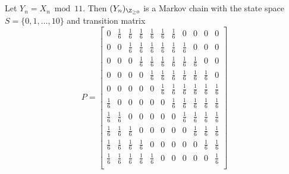 \documentclass[
  coursecode={MTHE 455},
  assignmentname={Assignment \assignmentnumber},
  studentnumber=20053722,
  name={Bryan Hoang},
  draft,
]{
  ltxanswer%
}
\begin{document}
\begin{questions}
\begin{parts}
      \part{}
      \begin{solution}
        Let \(Y_{n}= X_{n} \bmod 11\). Then \((Y_{n})_{\Z_{\ge 0}}\) is a Markov chain with the state space \(S=\{0,1,\dotsc,10\}\) and transition matrix
        \begin{equation*}
          P = \begin{bmatrix}
            0           & \frac{1}{6} & \frac{1}{6} & \frac{1}{6} & \frac{1}{6} & \frac{1}{6} & \frac{1}{6} & 0           & 0           & 0           & 0           \\[1ex]
            0           & 0           & \frac{1}{6} & \frac{1}{6} & \frac{1}{6} & \frac{1}{6} & \frac{1}{6} & \frac{1}{6} & 0           & 0           & 0           \\[1ex]
            0           & 0           & 0           & \frac{1}{6} & \frac{1}{6} & \frac{1}{6} & \frac{1}{6} & \frac{1}{6} & \frac{1}{6} & 0           & 0           \\[1ex]
            0           & 0           & 0           & 0           & \frac{1}{6} & \frac{1}{6} & \frac{1}{6} & \frac{1}{6} & \frac{1}{6} & \frac{1}{6} & 0           \\[1ex]
            0           & 0           & 0           & 0           & 0           & \frac{1}{6} & \frac{1}{6} & \frac{1}{6} & \frac{1}{6} & \frac{1}{6} & \frac{1}{6} \\[1ex]
            \frac{1}{6} & 0           & 0           & 0           & 0           & 0           & \frac{1}{6} & \frac{1}{6} & \frac{1}{6} & \frac{1}{6} & \frac{1}{6} \\[1ex]
            \frac{1}{6} & \frac{1}{6} & 0           & 0           & 0           & 0           & 0           & \frac{1}{6} & \frac{1}{6} & \frac{1}{6} & \frac{1}{6} \\[1ex]
            \frac{1}{6} & \frac{1}{6} & \frac{1}{6} & 0           & 0           & 0           & 0           & 0           & \frac{1}{6} & \frac{1}{6} & \frac{1}{6} \\[1ex]
            \frac{1}{6} & \frac{1}{6} & \frac{1}{6} & \frac{1}{6} & 0           & 0           & 0           & 0           & 0           & \frac{1}{6} & \frac{1}{6} \\[1ex]
            \frac{1}{6} & \frac{1}{6} & \frac{1}{6} & \frac{1}{6} & \frac{1}{6} & 0           & 0           & 0           & 0           & 0           & \frac{1}{6} \\[1ex]

\end{bmatrix}
\end{equation*}
\end{solution}
\end{parts}
\end{questions}
\end{document}
